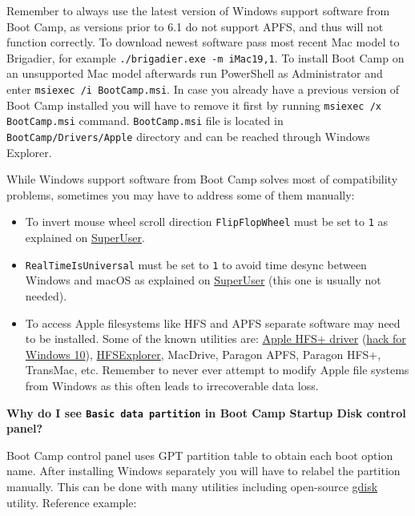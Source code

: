 \documentclass[]{article}
\begin{document}
  Remember to always use the latest version of Windows support software from Boot Camp,
  as versions prior to 6.1 do not support APFS, and thus will not function correctly.
  To download newest software pass most recent Mac model to Brigadier, for example
  \texttt{./brigadier.exe -m iMac19,1}. To install Boot Camp on an unsupported Mac model
  afterwards run PowerShell as Administrator and enter \texttt{msiexec /i BootCamp.msi}.
  In case you already have a previous version of Boot Camp installed you will have to
  remove it first by running \texttt{msiexec /x BootCamp.msi} command. \texttt{BootCamp.msi}
  file is located in \texttt{BootCamp/Drivers/Apple} directory and can be reached through
  Windows Explorer.

  While Windows support software from Boot Camp solves most of compatibility problems,
  sometimes you may have to address some of them manually:

  \begin{itemize}
  \item To invert mouse wheel scroll direction \texttt{FlipFlopWheel} must be set
  to \texttt{1} as explained on \href{https://superuser.com/a/364353}{SuperUser}.
  \item \texttt{RealTimeIsUniversal} must be set to \texttt{1} to avoid time
  desync between Windows and macOS as explained on
  \href{https://superuser.com/q/494432}{SuperUser} (this one is usually not needed).
  \item To access Apple filesystems like HFS and APFS separate software may need to
  be installed. Some of the known utilities are:
  \href{https://forums.macrumors.com/threads/apple-hfs-windows-driver-download.1368010/}{Apple HFS+ driver}
  (\href{https://forums.macrumors.com/threads/apple-hfs-windows-driver-download.1368010/post-24180079}{hack for Windows 10}),
  \href{http://www.catacombae.org/hfsexplorer}{HFSExplorer}, MacDrive, Paragon APFS,
  Paragon HFS+, TransMac, etc. Remember to never ever attempt to modify Apple file systems
  from Windows as this often leads to irrecoverable data loss.
  \end{itemize}

  \textbf{Why do I see \texttt{Basic data partition} in Boot Camp Startup Disk control panel?}

  Boot Camp control panel uses GPT partition table to obtain each boot option name.
  After installing Windows separately you will have to relabel the partition manually.
  This can be done with many utilities including open-source
  \href{https://sourceforge.net/projects/gptfdisk}{gdisk} utility. Reference example:
\end{document}
